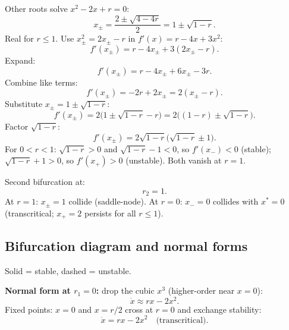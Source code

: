 \documentclass[11pt]{article}
\begin{document}
Other roots solve $x^{2}-2x+r=0$:
\[ x_{\pm}=\frac{2\pm\sqrt{4-4r}}{2}=1\pm\sqrt{1-r}. \]
Real for $r\le 1$. Use $x_\pm^{2}=2x_\pm-r$ in $f'(x)=r-4x+3x^{2}$:
\[ f'(x_\pm)=r-4x_\pm+3(2x_\pm-r). \]
Expand:
\[ f'(x_\pm)=r-4x_\pm+6x_\pm-3r. \]
Combine like terms:
\[ f'(x_\pm)=-2r+2x_\pm=2(x_\pm-r). \]
Substitute $x_\pm=1\pm\sqrt{1-r}$:
\[ f'(x_\pm)=2\bigl(1\pm\sqrt{1-r}-r\bigr)=2\bigl((1-r)\pm\sqrt{1-r}\bigr). \]
Factor $\sqrt{1-r}$:
\[ f'(x_\pm)=2\sqrt{1-r}\bigl(\sqrt{1-r}\pm 1\bigr). \]
For $0<r<1$: $\sqrt{1-r}>0$ and $\sqrt{1-r}-1<0$, so $f'(x_-)<0$ (stable); $\sqrt{1-r}+1>0$, so $f'(x_+)>0$ (unstable). Both vanish at $r=1$.

Second bifurcation at:
\[ \boxed{\;r_{2}=1.\;} \]
At $r=1$: $x_\pm=1$ collide (saddle-node). At $r=0$: $x_-=0$ collides with $x^{*}=0$ (transcritical; $x_+=2$ persists for all $r\le 1$).

\subsection*{Bifurcation diagram and normal forms}

\begin{center}
\end{center}

Solid = stable, dashed = unstable.

\textbf{Normal form at $r_1=0$:} drop the cubic $x^{3}$ (higher-order near $x=0$):
\[ \dot x\approx rx-2x^{2}. \]
Fixed points: $x=0$ and $x=r/2$ cross at $r=0$ and exchange stability:
\[ \boxed{\;\dot x=rx-2x^{2}\quad\text{(transcritical).}\;} \]
\end{document}
